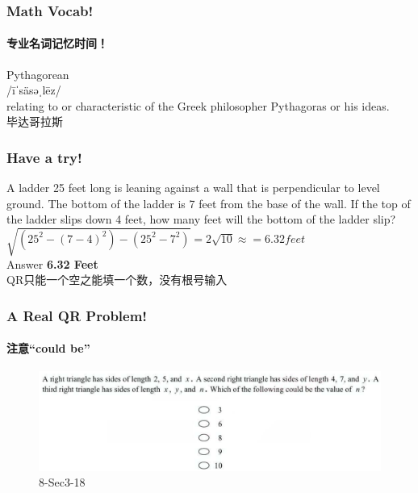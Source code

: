 \documentclass[
	11pt, %
]{beamer}
\begin{document}

\begin{frame}
	\frametitle{Math Vocab!} %
	\framesubtitle{专业名词记忆时间！}
	
	{\Huge Pythagorean}\\
	{\LARGE /īˈsäsəˌlēz/\\
		\bigskip\bigskip
	relating to or characteristic of the Greek philosopher Pythagoras or his ideas. \\ 
	毕达哥拉斯}
\end{frame}


\begin{frame}
	\frametitle{Have a try!}

A ladder 25 feet long is leaning against a wall that is perpendicular to level ground.
The bottom of the ladder is 7 feet from the base of the wall. If the top of the ladder
slips down 4 feet, how many feet will the bottom of the ladder slip?\\

\bigskip
\pause
$\sqrt{(25^2 - (7-4)^2) - (25^2- 7^2)} = 2\sqrt{10}\approx =6.32 feet $\\
\bigskip\pause
Answer \textbf{6.32 Feet} \pause 
\\\alert{QR只能一个空之能填一个数，没有根号输入}
\end{frame}


\begin{frame}
	\frametitle{A Real QR Problem!}
	\framesubtitle{注意“could be”}
	\begin{figure}
		\includegraphics[width=\linewidth]{Pythagorean_Example_Question2.png}
		\caption{8-Sec3-18}
	\end{figure}

\end{frame}

\end{document}
